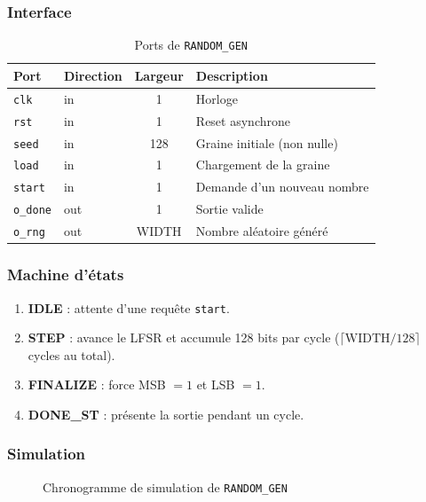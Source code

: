 \documentclass[12pt,a4paper]{report}
\begin{document}
\subsubsection{Interface}
\begin{table}[H]
\centering
\caption{Ports de \texttt{RANDOM\_GEN}}
\begin{tabular}{llcp{5cm}}
\toprule
\textbf{Port} & \textbf{Direction} & \textbf{Largeur} & \textbf{Description} \\
\midrule
\texttt{clk}    & in  & 1   & Horloge \\
\texttt{rst}    & in  & 1   & Reset asynchrone \\
\texttt{seed}   & in  & 128 & Graine initiale (non nulle) \\
\texttt{load}   & in  & 1   & Chargement de la graine \\
\texttt{start}  & in  & 1   & Demande d'un nouveau nombre \\
\texttt{o\_done} & out & 1   & Sortie valide \\
\texttt{o\_rng}  & out & WIDTH & Nombre aléatoire généré \\
\bottomrule
\end{tabular}
\end{table}


\subsubsection{Machine d'états}
\begin{enumerate}
  \item \textbf{IDLE} : attente d'une requête \texttt{start}.
  \item \textbf{STEP} : avance le LFSR et accumule 128 bits par cycle
        ($\lceil\text{WIDTH}/128\rceil$ cycles au total).
  \item \textbf{FINALIZE} : force MSB $= 1$ et LSB $= 1$.
  \item \textbf{DONE\_ST} : présente la sortie pendant un cycle.
\end{enumerate}

\subsubsection{Simulation}
\begin{figure}[H]
\centering
\caption{Chronogramme de simulation de \texttt{RANDOM\_GEN}}
\label{fig:sim_rng}
\end{figure}
\end{document}
